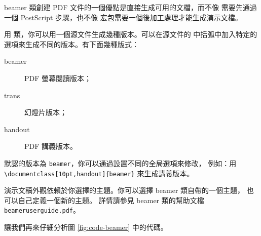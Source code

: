 beamer 類創建 PDF 文件的一個優點是直接生成可用的文檔，而不像  需要先通過
一個 PostScript 步驟，也不像  宏包需要一個後加工處理才能生成演示文檔。


用  類，你可以用一個源文件生成幾種版本。可以在源文件的
中括弧中加入特定的選項來生成不同的版本。有下面幾種版式：


\begin{description}
\item[beamer]  PDF 螢幕閱讀版本；
\item[trans] 幻燈片版本；
\item[handout]  PDF 講義版本。
\end{description}


默認的版本為 \texttt{beamer}，你可以通過設置不同的全局選項來修改，
例如：用 \verb|\documentclass[10pt,handout]{beamer}| 來生成講義版本。



演示文稿外觀依賴於你選擇的主題。你可以選擇 beamer 類自帶的一個主題，
也可以自己定義一個新的主題。
詳情請參見 beamer 類的幫助文檔 \texttt{beameruserguide.pdf}。

讓我們再來仔細分析圖 \ref{fig:code-beamer} 中的代碼。


